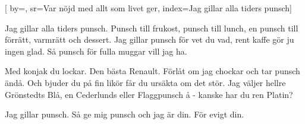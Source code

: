 

[ 		%
	by={},					%
	sr={Var nöjd med allt som livet ger},					%
	index={Jag gillar alla tiders punsch}]						%



\beginverse*						%
Jag gillar alla tiders punsch.
Punsch till frukost, punsch till lunch,
en punsch till förrätt, varmrätt och dessert.
Jag gillar punsch för vet du vad,
rent kaffe gör ju ingen glad.
Så punsch för fulla muggar vill jag ha.
\endverse							%

\beginverse*						%
Med konjak du lockar.
Den bästa Renault.
Förlåt om jag chockar
och tar punsch ändå.
Och bjuder du på fin likör
får du ursäkta om det stör.
Jag väljer hellre Grönstedts Blå,
en Cederlunds eller Flaggpunsch å
- kanske har du ren Platin?
\endverse							%

\beginverse*						%
Jag gillar punsch.
Så ge mig punsch och jag är din.
För evigt din.
\endverse							%

\endsong							%